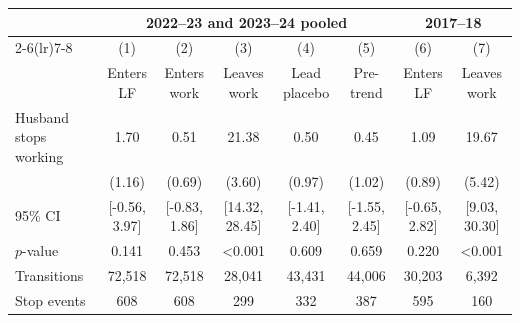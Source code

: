 \begin{tabular}{lccccccc}
\toprule
 & \multicolumn{5}{c}{2022--23 and 2023--24 pooled} & \multicolumn{2}{c}{2017--18} \\
\cmidrule(lr){2-6}\cmidrule(lr){7-8}
 & (1) & (2) & (3) & (4) & (5) & (6) & (7) \\
 & Enters LF & Enters work & Leaves work & Lead placebo & Pre-trend & Enters LF & Leaves work \\
\midrule
Husband stops working & 1.70 & 0.51 & 21.38 & 0.50 & 0.45 & 1.09 & 19.67 \\
 & (1.16) & (0.69) & (3.60) & (0.97) & (1.02) & (0.89) & (5.42) \\
95\% CI & [-0.56, 3.97] & [-0.83, 1.86] & [14.32, 28.45] & [-1.41, 2.40] & [-1.55, 2.45] & [-0.65, 2.82] & [9.03, 30.30] \\
$p$-value & 0.141 & 0.453 & <0.001 & 0.609 & 0.659 & 0.220 & <0.001 \\
Transitions & 72,518 & 72,518 & 28,041 & 43,431 & 44,006 & 30,203 & 6,392 \\
Stop events & 608 & 608 & 299 & 332 & 387 & 595 & 160 \\
\bottomrule
\end{tabular}

